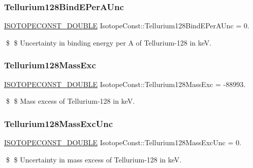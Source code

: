 \subsubsection{\texorpdfstring{Tellurium128\+Bind\+E\+Per\+A\+Unc}{Tellurium128BindEPerAUnc}}
{\footnotesize\ttfamily \mbox{\hyperlink{group___isotope_const-_macros_ga8f45a7272ce02c0b4c65c44636ed719a}{I\+S\+O\+T\+O\+P\+E\+C\+O\+N\+S\+T\+\_\+\+D\+O\+U\+B\+LE}} Isotope\+Const\+::\+Tellurium128\+Bind\+E\+Per\+A\+Unc = 0.}

\$ \$ Uncertainty in binding energy per A of Tellurium-\/128 in keV. \mbox{\label{group___isotope_const-_tellurium-_te128_ga92bbbe39f62d96ed2323e496fe485bbc}} 
\subsubsection{\texorpdfstring{Tellurium128\+Mass\+Exc}{Tellurium128MassExc}}
{\footnotesize\ttfamily \mbox{\hyperlink{group___isotope_const-_macros_ga8f45a7272ce02c0b4c65c44636ed719a}{I\+S\+O\+T\+O\+P\+E\+C\+O\+N\+S\+T\+\_\+\+D\+O\+U\+B\+LE}} Isotope\+Const\+::\+Tellurium128\+Mass\+Exc = -\/88993.}

\$ \$ Mass excess of Tellurium-\/128 in keV. \mbox{\label{group___isotope_const-_tellurium-_te128_gafd75ab18b675b940f01bc90bfa84a45c}} 
\subsubsection{\texorpdfstring{Tellurium128\+Mass\+Exc\+Unc}{Tellurium128MassExcUnc}}
{\footnotesize\ttfamily \mbox{\hyperlink{group___isotope_const-_macros_ga8f45a7272ce02c0b4c65c44636ed719a}{I\+S\+O\+T\+O\+P\+E\+C\+O\+N\+S\+T\+\_\+\+D\+O\+U\+B\+LE}} Isotope\+Const\+::\+Tellurium128\+Mass\+Exc\+Unc = 0.}

\$ \$ Uncertainty in mass excess of Tellurium-\/128 in keV. \mbox{\label{group___isotope_const-_tellurium-_te128_gaa1efecc178fec266069b1595ab3d9265}} 
